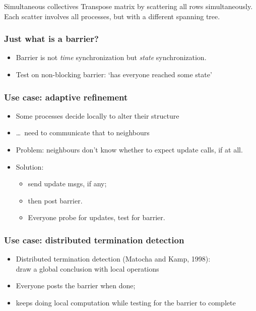 \begin{frame}[containsverbatim]{Simultaneous collectives}
  Transpose matrix by scattering all rows simultaneously.\\
  Each scatter involves all processes, but with a
  different spanning tree.

\end{frame}


\begin{frame}[containsverbatim]\frametitle{Just what is a barrier?}
  \begin{itemize}
  \item Barrier is not \emph{time} synchronization but \emph{state}
    synchronization.
  \item Test on non-blocking barrier: `has everyone reached some
    state'
  \end{itemize}
\end{frame}

\begin{frame}[containsverbatim]\frametitle{Use case: adaptive refinement}
  \begin{itemize}
  \item Some processes decide locally to alter their structure
  \item \ldots~need to communicate that to neighbours
  \item Problem: neighbours don't know whether to expect update calls,
    if at all.
  \item Solution:
    \begin{itemize}
    \item send update msgs, if any;
    \item then post barrier.
    \item Everyone probe for updates, test for barrier.    
    \end{itemize}
  \end{itemize}
\end{frame}

\begin{frame}\frametitle{Use case: distributed termination detection}
  \begin{itemize}
  \item Distributed termination detection (Matocha and Kamp, 1998):\\
    draw a global conclusion with local operations
  \item Everyone posts the barrier when done;
  \item keeps doing local computation while testing for the barrier to
    complete
  \end{itemize}
\end{frame}

